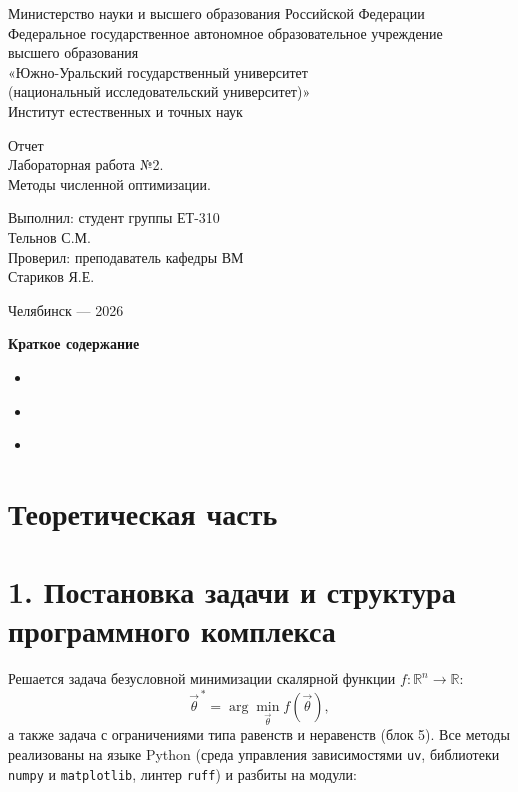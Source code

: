 \documentclass[a4paper]{article}
\newcommand{\mainsection}[1]{%
    \phantomsection
    \section*{\centering\fontsize{16pt}{0pt}\selectfont\textbf{#1}}%
}
\newcommand{\subsectiontext}[1]{%
    \section*{\fontsize{13pt}{0pt}\selectfont\textbf{#1}}%
}
\begin{document}
\centering
Министерство науки и высшего образования Российской Федерации\\
Федеральное государственное автономное образовательное учреждение\\
высшего образования\\
«Южно-Уральский государственный университет\\
(национальный исследовательский университет)»\\
Институт естественных и точных наук

\setlength{\parskip}{7.5cm}

Отчет\\
Лабораторная работа №2.\\
Методы численной оптимизации.

\setlength{\parskip}{5.9cm}

\raggedleft
\begin{minipage}{0.46\textwidth}
\raggedright
Выполнил: студент группы ЕТ-310\\
Тельнов С.М.\\
Проверил: преподаватель кафедры ВМ\\
Стариков Я.Е.
\end{minipage}

\setlength{\parskip}{5.84cm}

\centering
Челябинск — 2026

\setlength{\parskip}{0pt plus 1pt}
\newpage

\centering
\textbf{Краткое содержание}
\begin{itemize}
    \setlength{\parskip}{0.4cm}
    \item \hyperref[sec:theory]{ \dotfill \pageref{sec:theory}}
    \item \hyperref[sec:practice]{ \dotfill \pageref{sec:practice}}
    \item \hyperref[sec:conclusion]{ \dotfill \pageref{sec:conclusion}}
\end{itemize}
\newpage

\setlength{\parindent}{1.5em}

\raggedright

\label{sec:theory}
\mainsection{Теоретическая часть}

\subsectiontext{1. Постановка задачи и структура программного комплекса}

Решается задача безусловной минимизации скалярной функции $f: \mathbb{R}^n \to \mathbb{R}$:
\[
    \vec{\theta}^{\,*} = \arg\min_{\vec{\theta}} f(\vec{\theta}),
\]
а также задача с ограничениями типа равенств и неравенств (блок 5). Все методы реализованы на языке Python (среда управления зависимостями \texttt{uv}, библиотеки \texttt{numpy} и \texttt{matplotlib}, линтер \texttt{ruff}) и разбиты на модули:
\end{document}
